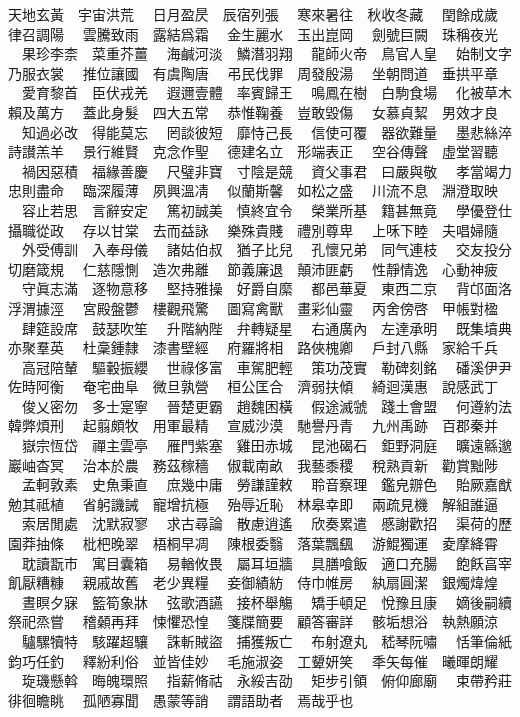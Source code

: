\documentclass[紅,便箋]{genkou}
\begin{document}
\ukai \LARGE\par\noindent
\leftskip=5mm
天地玄黃　宇宙洪荒
　日月盈昃　辰宿列張
　寒來暑往　秋收冬藏
　閏餘成歲　律召調陽
　雲騰致雨　露結爲霜
　金生麗水　玉出崑岡
　劍號巨闕　珠稱夜光
　果珍李柰　菜重芥薑
　海鹹河淡　鱗潛羽翔
　龍師火帝　鳥官人皇
　始制文字　乃服衣裳
　推位讓國　有虞陶唐
　弔民伐罪　周發殷湯
　坐朝問道　垂拱平章
　愛育黎首　臣伏戎羌
　遐邇壹體　率賓歸王
　鳴鳳在樹　白駒食場
　化被草木　賴及萬方
　蓋此身髮　四大五常
　恭惟鞠養　豈敢毀傷
　女慕貞絜　男效才良
　知過必改　得能莫忘
　罔談彼短　靡恃己長
　信使可覆　器欲難量
　墨悲絲淬　詩讃羔羊
　景行維賢　克念作聖
　德建名立　形端表正
　空谷傳聲　虛堂習聽
　禍因惡積　福緣善慶
　尺璧非寶　寸陰是競
　資父事君　曰嚴與敬
　孝當竭力　忠則盡命
　臨深履薄　夙興溫凊
　似蘭斯馨　如松之盛
　川流不息　淵澄取映
　容止若思　言辭安定
　篤初誠美　慎終宜令
　榮業所基　籍甚無竟
　學優登仕　攝職從政
　存以甘棠　去而益詠
　樂殊貴賤　禮別尊卑
　上咊下睦　夫唱婦隨
　外受傅訓　入奉母儀
　諸姑伯叔　猶子比兒
　孔懷兄弟　同气連枝
　交友投分　切磨箴規
　仁慈隱惻　造次弗離
　節義廉退　顛沛匪虧
　性靜情逸　心動神疲
　守眞志滿　逐物意移
　堅持雅操　好爵自縻
　都邑華夏　東西二京
　背邙面洛　浮渭據涇
　宮殿盤鬱　樓觀飛驚
　圖寫禽獸　畫彩仙靈
　丙舍傍啓　甲帳對楹%
　肆筵設席　鼓瑟吹笙
　升階納陛　弁轉疑星
　右通廣內　左達承明
　既集墳典　亦聚羣英
　杜稾鍾隸　漆書壁經
　府羅將相　路俠槐卿
　戶封八縣　家給千兵
　高冠陪輦　驅轂振纓
　世祿侈富　車駕肥輕
　策功茂實　勒碑刻銘
　磻溪伊尹　佐時阿衡
　奄宅曲阜　微旦孰營
　桓公匡合　濟弱扶傾
　綺迴漢惠　說感武丁
　俊乂密勿　多士寔寧
　晉楚更霸　趙魏困橫
　假途滅虢　踐土會盟
　何遵約法　韓弊煩刑
　起翦頗牧　用軍最精
　宣威沙漠　馳譽丹青
　九州禹跡　百郡秦并
　嶽宗恆岱　禪主雲亭
　雁門紫塞　雞田赤城
　昆池碣石　鉅野洞庭
　曠遠緜邈　巖岫杳冥
　治本於農　務茲稼穡
　俶載南畝　我藝黍稷
　稅熟貢新　勸賞黜陟
　孟軻敦素　史魚秉直
　庶幾中庸　勞謙謹敕
　聆音察理　鑑皃辧色
　貽厥嘉猷　勉其祗植
　省躬譏誡　寵增抗極
　殆辱近恥　林皋幸即
　兩疏見機　解組誰逼
　索居閒處　沈默寂寥
　求古尋論　散慮逍遙
　欣奏累遣　慼謝歡招
　渠荷的歷　園莽抽條
　枇杷晚翠　梧桐早凋
　陳根委翳　落葉飄颻
　游鯤獨運　夌摩絳霄
　耽讀翫市　寓目囊箱
　易輶攸畏　屬耳垣牆
　具膳喰飯　適口充腸
　飽飫亯宰　飢厭糟糠
　親戚故舊　老少異糧
　妾御績紡　侍巾帷房
　紈扇圓潔　銀燭煒煌
　晝瞑夕寐　籃筍象牀
　弦歌酒讌　接杯舉觴
　矯手頓足　悅豫且康
　嫡後嗣續　祭祀烝嘗
　稽顙再拜　悚懼恐惶
　箋牒簡要　顧答審詳
　骸垢想浴　執熱願涼
　驢騾犢特　駭躍超驤
　誅斬賊盜　捕獲叛亡
　布射遼丸　嵇琴阮嘯
　恬筆倫紙　鈞巧任釣
　釋紛利俗　並皆佳妙
　毛施淑姿　工顰妍笑
　秊矢每催　曦暉朗耀
　琁璣懸斡　晦魄環照
　指薪脩祜　永綏吉劭
　矩步引領　俯仰廊廟
　束帶矜莊　徘徊瞻眺
　孤陋寡聞　愚蒙等誚
　謂語助者　焉哉乎也
　　　　　　　　　　
　　　　　　　　　　
　　　　　　
\end{document}
